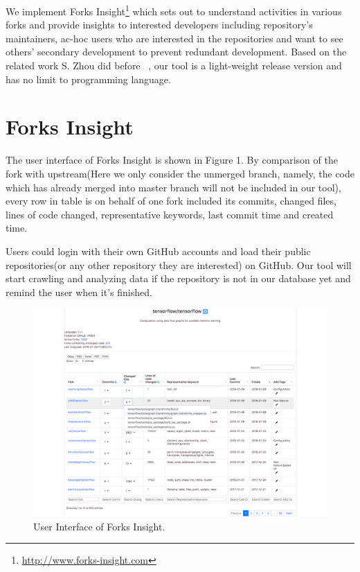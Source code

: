 We implement Forks Insight\footnote{\url{http://www.forks-insight.com}} which sets out to understand activities in various forks and provide insights to interested developers including repository's maintainers, ac-hoc users who are interested in the repositories and want to see others' secondary development to prevent redundant development. Based on the related work S. Zhou did before ~\cite{ZSLXWK:ICSE18}, our tool is a light-weight release version and has no limit to programming language.


\section{Forks Insight}

The user interface of Forks Insight is shown in Figure 1. By comparison of the fork with upstream(Here we only consider the unmerged branch, namely, the code which has already merged into master branch will not be included in our tool), every row in table is on behalf of one fork included its commits, changed files, lines of code changed, representative keywords, last commit time and created time.


Users could login with their own GitHub accounts and load their public repositories(or any other repository they are interested) on GitHub. Our tool will start crawling and analyzing data if the repository is not in our database yet and remind the user when it's finished.

\begin{figure}[H]
\includegraphics[scale=0.3]{tensorflow_snapshot3.pdf}
\caption{User Interface of Forks Insight.}
\end{figure}

